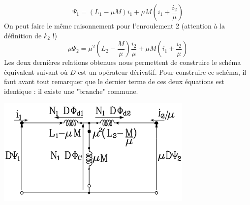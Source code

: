 		\begin{equation}
		\Psi_1=	\displaystyle (L_1-\mu M)i_1 + \mu M\left(i_1+\dfrac{i_2}{\mu}\right)
		\end{equation}
		On peut faire le même raisonnement pour l'enroulement 2 (attention à la 
		définition de $k_2$ !)
		\begin{equation}
		\mu\Psi_2 = \mu^2\left(L_2-\frac{M}{\mu}\right)\frac{i_2}{\mu} + \mu M\left(
		i_1+\frac{i_2}{\mu}\right)
		\end{equation}
		Les deux dernières relations obtenues nous permettent de construire le 
		schéma équivalent suivant où $D$ est un opérateur dérivatif. Pour 
		construire ce schéma, il faut avant tout remarquer que le dernier terme 
		de ces deux équations est identique : il existe une "branche" commune.
		\begin{center}
		\includegraphics[scale=0.57]{ch3/image10.png}
		\end{center}
		
